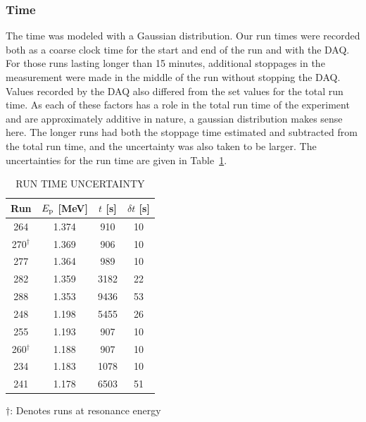 \subsubsection{Time}
The time was modeled with a Gaussian distribution. Our run times were
recorded both as a coarse clock time for the start and end of the run
and with the DAQ. For those runs lasting longer than 15 minutes,
additional stoppages in the measurement were made in the middle of the
run without stopping the DAQ. Values recorded by the DAQ also differed
from the set values for the total run time. As each of these factors has
a role in the total run time of the experiment and are approximately
additive in nature, a gaussian distribution makes sense here. The longer
runs had both the stoppage time estimated and subtracted from the total
run time, and the uncertainty was also taken to be larger. The
uncertainties for the run time are given in
Table~\ref{tab:run-time-uncertainty}.

\begin{table}[h]
    \begin{center}
        \caption{RUN TIME UNCERTAINTY}
        \label{tab:run-time-uncertainty}
        \begin{tabular}{cccc}
            \toprule
            \midrule
            \textbf{Run} & \textbf{$E_{\rm p}$ [MeV]} & \textbf{$t$ [s]}
                & \textbf{$\delta t$ [s]} \\
            \midrule
                264           & 1.374 &  910 & 10 \\
                270$^\dagger$ & 1.369 &  906 & 10 \\
                277           & 1.364 &  989 & 10 \\
                282           & 1.359 & 3182 & 22 \\
                288           & 1.353 & 9436 & 53 \\
                248           & 1.198 & 5455 & 26 \\
                255           & 1.193 &  907 & 10 \\
                260$^\dagger$ & 1.188 &  907 & 10 \\
                234           & 1.183 & 1078 & 10 \\
                241           & 1.178 & 6503 & 51 \\
            \bottomrule
        \end{tabular}

        \vspace{0.5em}
        $\dagger$: Denotes runs at resonance energy
    \end{center}
\end{table}

